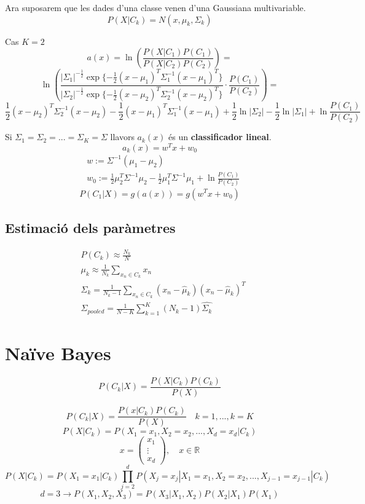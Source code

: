 Ara suposarem que les dades d'una classe venen d'una Gaussiana multivariable.
$$
P(X|C_k) = N(x, \mu_k, \Sigma_k)
$$

Cas $K=2$
$$
a(x) = \ln \left( \frac{P(X|C_1)P(C_1)}{P(X|C_2)P(C_2)} \right) =
$$
$$
\ln \left( \frac{|\Sigma_1|^{-\frac{1}{2}} 
	\exp\{ -\frac{1}{2}(x - \mu_1)^T \Sigma_1^{-1}(x - \mu_1)^T \} }
	{|\Sigma_2|^{-\frac{1}{2}} 
	\exp\{ -\frac{1}{2}(x - \mu_2)^T \Sigma_2^{-1}(x - \mu_2)^T \}} ·
\frac{P(C_1)}{P(C_2)}\right) =
$$
$$
\frac{1}{2}(x - \mu_2)^T \Sigma_2^{-1} (x - \mu_2) - \frac{1}{2}(x - \mu_1)^T 
\Sigma_1^{-1}(x - \mu_1) + \frac{1}{2}\ln|\Sigma_2| - \frac{1}{2}\ln|\Sigma_1| + 
\ln \frac{P(C_1)}{P(C_2)}
$$

Si $\Sigma_1 = \Sigma_2 = ... = \Sigma_K = \Sigma$ llavors $a_k(x)$ és un \textbf{classificador lineal}.
$$
a_k(x) = w^T x + w_0
$$
\begin{align*}
	& w := \Sigma^{-1}(\mu_1 - \mu_2) \\
	& w_0 := \frac{1}{2} \mu_2^T \Sigma^{-1}\mu_2 - \frac{1}{2}\mu_1^T \Sigma^{-1}\mu_1
	+ \ln \frac{P(C_1)}{P(C_2)}
\end{align*}
$$
P(C_1|X) = g(a(x)) = g(w^Tx + w_0)
$$

\subsection{Estimació dels paràmetres}

\begin{align*}
&	P(C_k) \approx \frac{N_k}{N} \\
&	\mu_k \approx \frac{1}{N_k} \sum_{x_n \in C_k} x_n \\
&	\Sigma_k = \frac{1}{N_k - 1} \sum_{x_n \in C_k} (x_n - \hat{\mu}_k)(x_n - \hat{\mu}_k)^T \\
&	\Sigma_{pooled} = \frac{1}{N - K} \sum_{k=1}^K (N_k - 1) \hat{\Sigma_k}
\end{align*}

\section{Naïve Bayes}
$$
P(C_k|X) = \frac{P(X|C_k)P(C_k)}{P(X)}
$$


$$
P(C_k|X) = \frac{P(x|C_k)P(C_k)}{P(X)} \quad k=1,...,k=K
$$
$$
P(X|C_k) = P(X_1=x_1, X_2=x_2, ..., X_d = x_d|C_k)
$$
$$
x = 
\begin{pmatrix}
x_1 \\ \vdots \\ x_d
\end{pmatrix}, \quad
x \in \mathbb{R}
$$
$$
P(X|C_k) = P(X_1=x_1|C_k)\prod_{j=2}^d P(X_j=x_j|X_1=x_1,X_2=x_2,...,X_{j-1}=x_{j-1}|C_k)
$$
$$
d=3 \rightarrow P(X_1,X_2,X_3) = P(X_3|X_1,X_2)P(X_2|X_1)P(X_1)
$$

